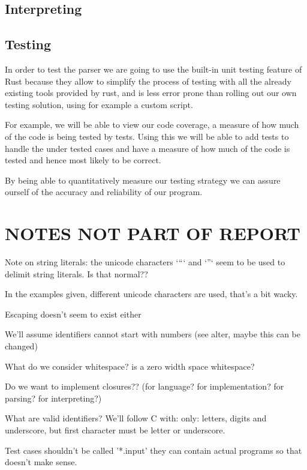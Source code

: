 \documentclass{article}
\begin{document}
\subsection{Interpreting}

\subsection{Testing}

In order to test the parser we are going to use the built-in unit testing
feature of Rust because they allow to simplify the process of testing with all
the already existing tools provided by rust, and is less error prone than
rolling out our own testing solution, using for example a custom script.

For example, we will be able to view our code coverage, a measure of how much
of the code is being tested by tests. Using this we will be able to add tests
to handle the under tested cases and have a measure of how much of the code is
tested and hence most likely to be correct.

By being able to quantitatively measure our testing strategy we can assure
ourself of the accuracy and reliability of our program.

\section{NOTES NOT PART OF REPORT}

Note on string literals: the unicode characters `“` and `”` seem to be used to
delimit string literals. Is that normal??

In the examples given, different unicode characters are used, that's a bit
wacky.

Escaping doesn't seem to exist either

We'll assume identifiers cannot start with numbers (see alter, maybe this can
be changed)

What do we consider whitespace? is a zero width space whitespace?

Do we want to implement closures?? (for language? for implementation? for parsing? for interpreting?)

What are valid identifiers? We'll follow C with: only: letters, digits and
underscore, but first character must be letter or underscore.

Test cases shouldn't be called '*.input' they can contain actual programs so
that doesn't make sense.

\end{document}
